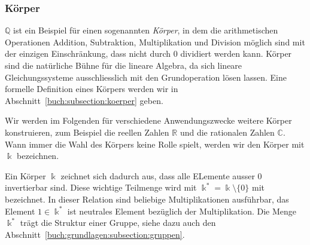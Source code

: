 \subsubsection{Körper}
$\mathbb{Q}$ ist ein Beispiel für einen sogenannten {\em Körper}, 
%
in dem die arithmetischen Operationen Addition, Subtraktion, Multiplikation
und Division möglich sind mit der einzigen Einschränkung, dass nicht durch
$0$ dividiert werden kann.
Körper sind die natürliche Bühne für die lineare Algebra, da sich lineare
Gleichungssysteme ausschliesslich mit den Grundoperation lösen lassen.
Eine formelle Definition eines Körpers werden wir in 
Abschnitt~\ref{buch:subsection:koerper} geben.

Wir werden im Folgenden für verschiedene Anwendungszwecke weitere Körper
konstruieren, zum Beispiel die reellen Zahlen $\mathbb{R}$ und die
rationalen Zahlen $\mathbb{C}$.
Wann immer die Wahl des Körpers keine Rolle spielt, werden wir den
Körper mit $\Bbbk$ bezeichnen.
%

Ein Körper $\Bbbk$ zeichnet sich dadurch aus, dass alle ELemente ausser $0$
invertierbar sind. 
Diese wichtige Teilmenge wird mit $\Bbbk^* = \Bbbk \setminus\{0\}$ mit
bezeichnet.
\label{buch:zahlen:def:bbbk*}
In dieser Relation sind beliebige Multiplikationen ausführbar, das Element
$1\in\Bbbk^*$ ist neutrales Element bezüglich der Multiplikation.
Die Menge $\Bbbk^*$ trägt die Struktur einer Gruppe, siehe dazu auch
den Abschnitt~\ref{buch:grundlagen:subsection:gruppen}.



